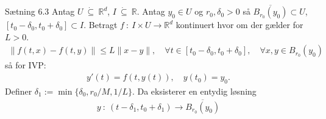 \begin{boks}{Sætning 6.3}
  Antag $U \ \dot{\subseteq} \ \mathbb{R}^d$, $I \ \dot{\subseteq} \ \mathbb{R}$. Antag $y_0 \in U$ og $r_0, \delta_0 > 0$ så $\overline{B_{r_0}(y_0)} \subset U$, $[t_0 - \delta_0, t_0 + \delta_0] \subset I$.
  Betragt $f \ : \ I \times U \rightarrow \mathbb{R}^d$ kontinuert hvor om der gælder for $L > 0$.
  \begin{align}\label{enkelt_kors}
    \| f(t,x) - f(t,y)\| \leq L \| x - y \|, \quad \forall t \in [t_0 - \delta_0, t_0 + \delta_0], \quad \forall x,y \in B_{r_0}(y_0)
  \end{align}
  så for IVP:
  \begin{align}\label{trippel_kors}
    y'(t) = f(t, y(t)), \quad y(t_0) = y_0.
  \end{align}
  Definer $\delta_1 := \min \{\delta_0, r_0/M, 1/L \}$. Da eksisterer en entydig løsning
  \begin{align*}
    y \ : \ (t - \delta_1, t_0 + \delta_1) \rightarrow \overline{B_{r_0}(y_0)}
  \end{align*}
\end{boks}
